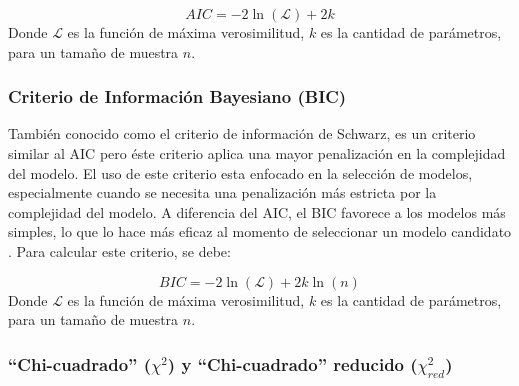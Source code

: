 \begin{equation}
    AIC = -2\ln(\mathcal{L})+2k
\end{equation}
Donde $\mathcal{L}$ es la función de máxima verosimilitud, $k$ es la cantidad de parámetros, para un tamaño de muestra $n$.

\subsubsection{Criterio de Información Bayesiano (BIC)}\label{biclabel}

También conocido como el criterio de información de Schwarz, es un criterio similar al AIC pero éste criterio aplica una mayor penalización en la complejidad del modelo. El uso de este criterio esta enfocado en la selección de modelos, especialmente cuando se necesita  una penalización más estricta por la complejidad del modelo. A diferencia del AIC, el BIC favorece a los modelos más simples, lo que lo hace más eficaz al momento de seleccionar un modelo candidato \cite{aicbicdata}. Para calcular este criterio, se debe:

\begin{equation}
    BIC = -2\ln(\mathcal{L})+2k\ln(n)
\end{equation}
Donde $\mathcal{L}$ es la función de máxima verosimilitud, $k$ es la cantidad de parámetros, para un tamaño de muestra $n$.


\subsubsection{``Chi-cuadrado'' ($\chi^{2}$) y ``Chi-cuadrado'' reducido ($\chi^{2}_{red}$)}

